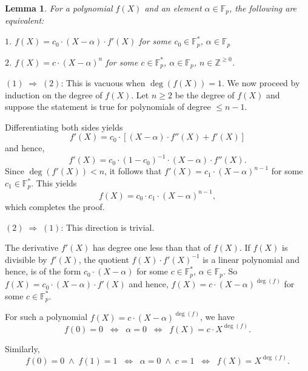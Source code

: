 \documentclass[11pt, lettersize, notitlepage, leqno, footskip=0.6cm]{article}
\newcommand{\bz}{\mathbb Z}
\newcommand{\bFp}{\mathbb{F}_p}
\newcommand{\LRA}{\Longleftrightarrow}
\newcommand{\al}{\alpha}
\newcommand{\vs}{\vspace{-0.15cm}}
\newcommand{\noin}{\noindent}
\newtheorem{Lem}[Thm]{Lemma}
\numberwithin{equation}{section}
\begin{document}
\bigskip


\begin{Lem} For a polynomial $f(X)$ and an element $\al \in \bFp$, the following are equivalent:\vspace{2mm}

\noin $1$. $f(X) = c_0\cdot (X-\al)\cdot f'(X)$ for some $c_0\in\bFp^*$, $\al\in \bFp$ \vspace{1mm}

\noin $2$. $f(X) = c\cdot (X-\al)^n$ for some $c\in\bFp^*$, $\al\in \bFp$, $n\in \bz^{\geq 0}$. \end{Lem}

\begin{prf} $(1) \;\Rightarrow\; (2)$: This is vacuous when $\deg(f(X)) = 1$. We now proceed by induction on the degree of $f(X)$. Let $n\geq 2$ be the degree of $f(X)$ and suppose the statement is true for polynomials of degree $\leq n-1$.  

Differentiating both sides yields \vs $$f'(X) = c_0 \cdot [(X-\al)\cdot f''(X) + f'(X) ] $$ and hence, \vs $$ f'(X) = c_0\cdot (1-c_0)^{-1}\cdot (X-\al)\cdot  f''(X) .  $$ Since $\deg(f'(X))< n$, it follows that $f'(X) = c_1\cdot (X-\al)^{n-1}$ for some $c_1\in \bFp^{*}$. This yields \vs $$ f(X) =  c_0\cdot c_1 \cdot (X-\al)^{n-1}, $$ which completes the proof. \vspace{1mm}


\noin $(2) \;\Rightarrow\; (1)$: This direction is trivial. \end{prf}


The derivative $f'(X)$ has degree one less than that of $f(X)$. If $f(X)$ is divisible by $f'(X)$, the quotient $f(X)\cdot f'(X)^{-1}$ is a linear polynomial and hence, is of the form $c_0\cdot (X-\al)$ for some $c\in \bFp^*$, $\al\in \bFp$. So $f(X) = c_0\cdot (X-\al)\cdot f'(X)$ and hence, $f(X) = c\cdot (X-\al)^{\deg(f)}$ for some $c\in \bFp^* $.

For such a polynomial $f(X) = c\cdot (X-\al)^{\deg(f)}$, we have $$ f(0) = 0\;\;\LRA\;\; \al = 0\;\;\LRA\;\; f(X) = c\cdot X^{\deg(f)}.$$

Similarly, $$ f(0) = 0\;\wedge\; f(1) = 1\;\;\LRA\;\; \al = 0\;\wedge\; c = 1\;\;\LRA\;\; f(X) =  X^{\deg(f)}.$$

\vspace{2mm}
\end{document}
